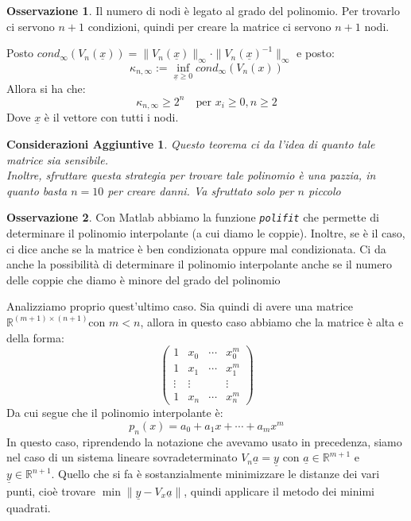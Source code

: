 \documentclass[11pt,a4paper,twoside]{article}
\newtheorem*{cons}{Considerazioni Aggiuntive}
\theoremstyle{definition}
\newtheorem*{oss}{Osservazione}
\begin{document}
\begin{oss}
	Il numero di nodi è legato al grado del polinomio. Per trovarlo ci servono $n+1$ condizioni, quindi per creare la matrice ci servono $n+1$ nodi.
\end{oss}

\begin{thm}{}{}
	Posto $cond_\infty(V_n(\underline x)) = \|V_n(\underline x)\|_\infty \cdot \|V_n(\underline x)^{-1}\|_\infty$ e posto:
	\[\kappa_{n, \infty}:= \inf_{\underline x \geq 0}cond_\infty (V_n(x))\]
	Allora si ha che:
	\[\kappa_{n, \infty}\geq 2^n\quad \text{per }x_i\geq 0, n\geq 2\]
	Dove $\underline x$ è il vettore con tutti i nodi.
\end{thm}

\begin{cons}
	Questo teorema ci da l'idea di quanto tale matrice sia sensibile.\\
	Inoltre, sfruttare questa strategia per trovare tale polinomio è una pazzia, in quanto basta $n=10$ per creare danni. Va sfruttato solo per $n$ piccolo
\end{cons}

\begin{oss}
	Con Matlab abbiamo la funzione \emph{\texttt{polifit}} che permette di determinare il polinomio interpolante (a cui diamo le coppie). Inoltre, se è il caso, ci dice anche se la matrice è ben condizionata oppure mal condizionata. Ci da anche la possibilità di determinare il polinomio interpolante anche se il numero delle coppie che diamo è minore del grado del polinomio
\end{oss}

Analizziamo proprio quest'ultimo caso. Sia quindi di avere una matrice $\mathbb R^{(m+1)\times (n+1)}$con $m<n$, allora in questo caso abbiamo che la matrice è alta e della forma:
\[ \begin{pmatrix} 1 & x_0 & \cdots & x_0^m\\ 1 & x_1 & \cdots & x_1^m\\ \vdots & \vdots & & \vdots\\ 1 & x_n & \cdots & x_n^m \end{pmatrix} \]
Da cui segue che il polinomio interpolante è:
\[ p_n (x) = a_0 + a_1x + \cdots + a_mx^m\]
In questo caso, riprendendo la notazione che avevamo usato in precedenza, siamo nel caso di un sistema lineare sovradeterminato $V_n \underline a = \underline y$ con $\underline a \in \mathbb R^{m+1}$ e $\underline y \in \mathbb R^{n+1}$. Quello che si fa è sostanzialmente minimizzare le distanze dei vari punti, cioè trovare $\min \|\underline y - V_x \underline a\|$, quindi applicare il metodo dei minimi quadrati.
\end{document}
